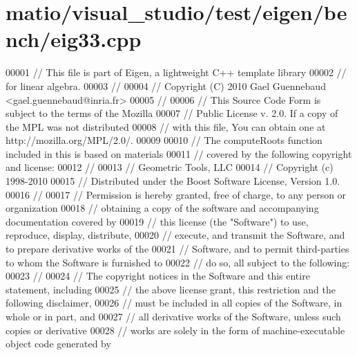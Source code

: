\hypertarget{matio_2visual__studio_2test_2eigen_2bench_2eig33_8cpp_source}{}\section{matio/visual\+\_\+studio/test/eigen/bench/eig33.cpp}
\label{matio_2visual__studio_2test_2eigen_2bench_2eig33_8cpp_source}

\begin{DoxyCode}
00001 \textcolor{comment}{// This file is part of Eigen, a lightweight C++ template library}
00002 \textcolor{comment}{// for linear algebra.}
00003 \textcolor{comment}{//}
00004 \textcolor{comment}{// Copyright (C) 2010 Gael Guennebaud <gael.guennebaud@inria.fr>}
00005 \textcolor{comment}{//}
00006 \textcolor{comment}{// This Source Code Form is subject to the terms of the Mozilla}
00007 \textcolor{comment}{// Public License v. 2.0. If a copy of the MPL was not distributed}
00008 \textcolor{comment}{// with this file, You can obtain one at http://mozilla.org/MPL/2.0/.}
00009 
00010 \textcolor{comment}{// The computeRoots function included in this is based on materials}
00011 \textcolor{comment}{// covered by the following copyright and license:}
00012 \textcolor{comment}{// }
00013 \textcolor{comment}{// Geometric Tools, LLC}
00014 \textcolor{comment}{// Copyright (c) 1998-2010}
00015 \textcolor{comment}{// Distributed under the Boost Software License, Version 1.0.}
00016 \textcolor{comment}{// }
00017 \textcolor{comment}{// Permission is hereby granted, free of charge, to any person or organization}
00018 \textcolor{comment}{// obtaining a copy of the software and accompanying documentation covered by}
00019 \textcolor{comment}{// this license (the "Software") to use, reproduce, display, distribute,}
00020 \textcolor{comment}{// execute, and transmit the Software, and to prepare derivative works of the}
00021 \textcolor{comment}{// Software, and to permit third-parties to whom the Software is furnished to}
00022 \textcolor{comment}{// do so, all subject to the following:}
00023 \textcolor{comment}{// }
00024 \textcolor{comment}{// The copyright notices in the Software and this entire statement, including}
00025 \textcolor{comment}{// the above license grant, this restriction and the following disclaimer,}
00026 \textcolor{comment}{// must be included in all copies of the Software, in whole or in part, and}
00027 \textcolor{comment}{// all derivative works of the Software, unless such copies or derivative}
00028 \textcolor{comment}{// works are solely in the form of machine-executable object code generated by}

\end{DoxyCode}
